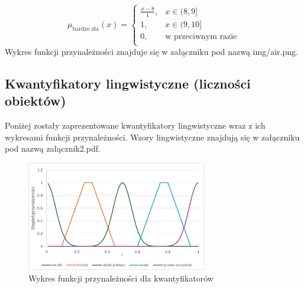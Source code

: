\documentclass{article}
\begin{document}
\begin{enumerate}
                \begin{equation}
                    \mu_{\text{bardzo zła}}(x) =
                    \begin{cases}
                    \frac{x - 8}{1}, &  x \in (8, 9] \\
                    1, & x \in (9, 10] \\
                    0, & \text{w przeciwnym razie} \\
                    \end{cases}
                \end{equation}
Wykres funkcji przynależności znajduje się w załączniku pod nazwą img/air.png.
\end{enumerate}


\subsection{Kwantyfikatory lingwistyczne (liczności obiektów)}
Poniżej zostały zaprezentowane kwantyfikatory lingwistyczne wraz z ich wykresami funkcji przynależności. Wzory lingwistyczne znajdują się w załączniku pod nazwą załącznik2.pdf.

\begin{figure}[h!]
    \centering
    \includegraphics[width=0.7\textwidth]{img/a.png}
    \caption{Wykres funkcji przynależności dla kwantyfikatorów}
\end{figure}
\end{document}
